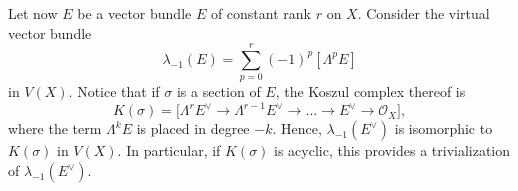 \documentclass[JEP,XML,SOM,Unicode,published]{cedram}
\theoremstyle{plain}
\theoremstyle{definition}
\newcommand{\Ocal}{\mathcal O}
\begin{document}
Let now $E$ be a vector bundle $E$ of constant rank $r$ on $X$. Consider the virtual vector bundle
\begin{equation}\label{eq:lambda-1def}
\lambda_{-1}(E) = \sum_{p=0}^r (-1)^p [\Lambda^p E]
\end{equation}
in $V(X)$. Notice that if $\sigma$ is a section of $E$, the Koszul complex thereof is
\begin{equation}\label{def:lambdaKosz}
K(\sigma) = \bigl[\Lambda^r E^\vee \to \Lambda^{r-1} E^\vee \to \ldots \to E^{\vee} \to \Ocal_X\bigr],
\end{equation}
where the term $\Lambda^{k}E$ is placed in degree $-k$. Hence, $\lambda_{-1}(E^\vee)$ is isomorphic to $K(\sigma)$ in $V(X)$. In particular, if $K(\sigma)$ is acyclic, this provides a trivialization of $\lambda_{-1}(E^{\vee})$.
\end{document}
